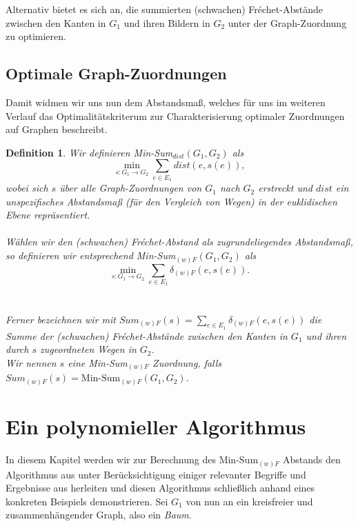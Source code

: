 \documentclass[a4paper, 12pt, twoside]{article}
\theoremstyle{Format1} %
\newtheorem{Def}{Definition}[section]       %
\begin{document}
Alternativ bietet es sich an, die summierten (schwachen) Fréchet-Abstände zwischen den Kanten in $G_1$ und ihren Bildern in $G_2$ unter der Graph-Zuordnung zu optimieren.

\subsection{Optimale Graph-Zuordnungen} \label{Optimale Graphzuordnungen}
Damit widmen wir uns nun dem Abstandsmaß, welches für uns im weiteren Verlauf das Optimalitätskriterum zur Charakterisierung optimaler Zuordnungen auf Graphen beschreibt.

\begin{Def} \label{Definition Min-Sum}
	Wir definieren \textit{Min-Sum}$_{dist}(G_1, G_2)$ als
	$$\min_{s: G_1 \to G_2} \sum_{e \in E_1} dist(e, s(e)),$$
	wobei sich $s$ über alle Graph-Zuordnungen von $G_1$ nach $G_2$ erstreckt und $dist$ ein unspezifisches Abstandsmaß (für den Vergleich von Wegen)
	in der euklidischen Ebene repräsentiert.
	\\
	\\
	Wählen wir den (schwachen) Fréchet-Abstand als zugrundeliegendes Abstandsmaß, so definieren wir entsprechend
	\textit{Min-Sum}$_{(w)F}(G_1, G_2)$ als $$\min_{s: G_1 \to G_2} \sum_{e \in E_1} \delta_{(w)F}(e, s(e)).$$
	\\
	\\
	Ferner bezeichnen wir mit $Sum_{(w)F}(s) = \sum_{e \in E_1}\delta_{(w)F}(e, s(e))$ die Summe der (schwachen) Fréchet-Abstände zwischen den Kanten
	in $G_1$ und ihren durch $s$ zugeordneten Wegen in $G_2$.
	\\
	Wir nennen $s$ eine Min-Sum$_{(w)F}$ Zuordnung, falls
	\\
	$Sum_{(w)F}(s) = \text{Min-Sum}_{(w)F}(G_1,G_2)$.
\end{Def}

\newpage
\section{Ein polynomieller Algorithmus} \label{Kapitel 3}

In diesem Kapitel werden wir zur Berechnung des Min-Sum$_{(w)F}$ Abstands den Algorithmus aus \cite{Buchin} unter Berücksichtigung einiger relevanter
Begriffe und Ergebnisse aus \cite{Akitaya} herleiten und diesen Algorithmus schließlich anhand eines konkreten Beispiels demonstrieren.
Sei $G_1$ von nun an ein kreisfreier und zusammenhängender Graph, also ein \textit{Baum}.
\end{document}
